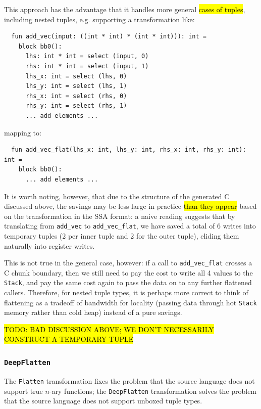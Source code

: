 \documentclass[leqno,11pt]{article}
\begin{document}
This approach has the advantage that it handles more general \hl{cases of
  tuples}, including nested tuples, e.g. supporting a transformation like:
\begin{verbatim}
  fun add_vec(input: ((int * int) * (int * int))): int =
    block bb0():
      lhs: int * int = select (input, 0)
      rhs: int * int = select (input, 1)
      lhs_x: int = select (lhs, 0)
      lhs_y: int = select (lhs, 1)
      rhs_x: int = select (rhs, 0)
      rhs_y: int = select (rhs, 1)
      ... add elements ...
\end{verbatim}
mapping to:
\begin{verbatim}
  fun add_vec_flat(lhs_x: int, lhs_y: int, rhs_x: int, rhs_y: int): int =
    block bb0():
      ... add elements ...
\end{verbatim}
It is worth noting, however, that due to the structure of the generated C
discussed above, the savings may be less large in practice \hl{than they appear}
based on the transformation in the SSA format: a naive reading suggests that by
translating from \texttt{add\_vec} to \texttt{add\_vec\_flat}, we have saved a
total of 6 writes into temporary tuples (2 per inner tuple and 2 for the outer
tuple), eliding them naturally into register writes.

This is not true in the general case, however: if a call to
\texttt{add\_vec\_flat} crosses a C chunk boundary, then we still need to pay the
cost to write all 4 values to the \texttt{Stack}, and pay the same cost again to
pass the data on to any further flattened callers. Therefore, for nested tuple
types, it is perhaps more correct to think of flattening as a tradeoff of
bandwidth for locality (passing data through hot \texttt{Stack} memory rather
than cold heap) instead of a pure savings.

\hl{TODO: BAD DISCUSSION ABOVE; WE DON'T NECESSARILY CONSTRUCT A TEMPORARY
  TUPLE}



\subsubsection{\texttt{DeepFlatten}}
The \texttt{Flatten} transformation fixes the problem that the source language
does not support true $n$-ary functions; the \texttt{DeepFlatten} transformation
solves the problem that the source language does not support unboxed tuple types.
\end{document}
